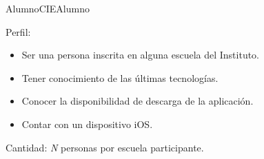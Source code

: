 \begin{actor}{Alumno}{CIEAlumno}
	\item[Perfil:] \hspace{1pt}
		\begin{itemize}
		    \item Ser una persona inscrita en alguna escuela del Instituto.
		    \item Tener conocimiento de las últimas tecnologías.
		    \item Conocer la disponibilidad de descarga de la aplicación.
		    \item Contar con un dispositivo iOS.
	    \end{itemize}

	\item[Cantidad:] \textit{N} personas por escuela participante.

\end{actor}

